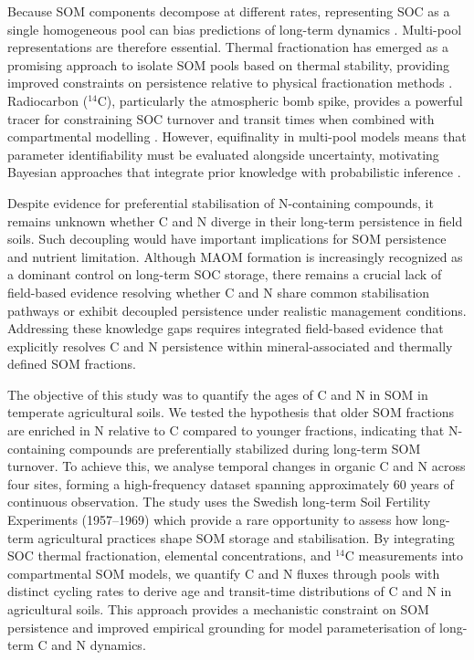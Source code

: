\documentclass[bg, manuscript]{copernicus}
\begin{document}
Because SOM components decompose at different rates, representing SOC as a single homogeneous pool can bias predictions of long-term dynamics \citep{KogelKnabner2008, Trumbore2009}. Multi-pool representations are therefore essential. Thermal fractionation has emerged as a promising approach to isolate SOM pools based on thermal stability, providing improved constraints on persistence relative to physical fractionation methods \citep{Sanderman2020, Stoner2023}. Radiocarbon ($^{14}\text{C}$), particularly the atmospheric bomb spike, provides a powerful tracer for constraining SOC turnover and transit times when combined with compartmental modelling \citep{Trumbore2009, Torn2009, Sierra2018a, Sierra2018b}. However, equifinality in multi-pool models means that parameter identifiability must be evaluated alongside uncertainty, motivating Bayesian approaches that integrate prior knowledge with probabilistic inference \citep{Wang2013}.

Despite evidence for preferential stabilisation of N-containing compounds, it remains unknown whether C and N diverge in their long-term persistence in field soils. Such decoupling would have important implications for SOM persistence and nutrient limitation. Although MAOM formation is increasingly recognized as a dominant control on long-term SOC storage, there remains a crucial lack of field-based evidence resolving whether C and N share common stabilisation pathways or exhibit decoupled persistence under realistic management conditions. Addressing these knowledge gaps requires integrated field-based evidence that explicitly resolves C and N persistence within mineral-associated and thermally defined SOM fractions.

The objective of this study was to quantify the ages of C and N in SOM in temperate agricultural soils. We tested the hypothesis that older SOM fractions are enriched in N relative to C compared to younger fractions, indicating that N-containing compounds are preferentially stabilized during long-term SOM turnover. To achieve this, we analyse temporal changes in organic C and N across four sites, forming a high-frequency dataset spanning approximately 60 years of continuous observation. The study uses the Swedish long-term Soil Fertility Experiments (1957--1969) \citep{Carlgren2001} which provide a rare opportunity to assess how long-term agricultural practices shape SOM storage and stabilisation. By integrating SOC thermal fractionation, elemental concentrations, and $^{14}\text{C}$ measurements into compartmental SOM models, we quantify C and N fluxes through pools with distinct cycling rates to derive age and transit-time distributions of C and N in agricultural soils. This approach provides a mechanistic constraint on SOM persistence and improved empirical grounding for model parameterisation of long-term C and N dynamics.
\end{document}
